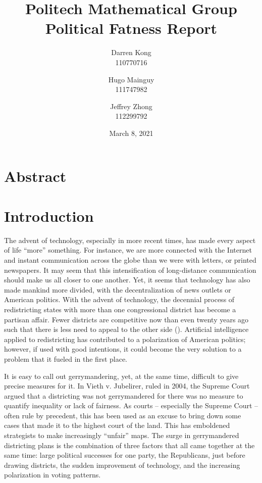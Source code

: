 \documentclass[letterpaper]{article}
\title{
	\textbf{Politech Mathematical Group} \\ 
	\vspace{2ex} 
	Political Fatness Report
	\vspace{2ex}
}
\author{
	Darren Kong \\ 110770716
	\and 
	Hugo Mainguy \\ 111747982
	\and 
	Jeffrey Zhong \\ 112299792
	\vspace{3ex}
}
\date{March 8, 2021}
\begin{document}
\begin{titlepage}
\maketitle
\thispagestyle{empty}
\end{titlepage}

\section{Abstract}

\section{Introduction}

The advent of technology, especially in more recent times, has made every aspect of life “more” something. For instance, we are more connected with the Internet and instant communication across the globe than we were with letters, or printed newspapers. It may seem that this intensification of long-distance communication should make us all closer to one another. Yet, it seems that technology has also made mankind more divided, with the decentralization of news outlets or American politics. With the advent of technology, the decennial process of redistricting states with more than one congressional district has become a partisan affair. Fewer districts are competitive now than even twenty years ago such that there is less need to appeal to the other side (\cite{cook}). Artificial intelligence applied to redistricting has contributed to a polarization of American politics; however, if used with good intentions, it could become the very solution to a problem that it fueled in the first place.

It is easy to call out gerrymandering, yet, at the same time, difficult to give precise measures for it. In Vieth v. Jubelirer, ruled in 2004, the Supreme Court argued that a districting was not gerrymandered for there was no measure to quantify inequality or lack of fairness. As courts – especially the Supreme Court – often rule by precedent, this has been used as an excuse to bring down some cases that made it to the highest court of the land. This has emboldened strategists to make increasingly “unfair” maps. The surge in gerrymandered districting plans is the combination of three factors that all came together at the same time: large political successes for one party, the Republicans, just before drawing districts, the sudden improvement of technology, and the increasing polarization in voting patterns.
\end{document}
